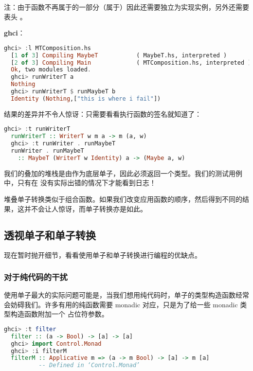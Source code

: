 \documentclass[./main.tex]{subfiles}
\begin{document}
注：由于函数不再属于的一部分（属于）因此还需要独立为实现实例，另外还需要表头
。

\textbf{ghci}：

\begin{lstlisting}[language=Haskell]
  ghci> :l MTComposition.hs
  [1 of 3] Compiling MaybeT           ( MaybeT.hs, interpreted )
  [2 of 3] Compiling Main             ( MTComposition.hs, interpreted )
  Ok, two modules loaded.
  ghci> runWriterT a
  Nothing
  ghci> runWriterT $ runMaybeT b
  Identity (Nothing,["this is where i fail"])
\end{lstlisting}

结果的差异并不令人惊讶：只需要看看执行函数的签名就知道了：

\begin{lstlisting}[language=Haskell]
  ghci> :t runWriterT
  runWriterT :: WriterT w m a -> m (a, w)
  ghci> :t runWriter . runMaybeT
  runWriter . runMaybeT
    :: MaybeT (WriterT w Identity) a -> (Maybe a, w)
\end{lstlisting}

我们的叠加的堆栈是由作为底层单子，因此必须返回一个类型。我们的测试用例中，只有在
没有实际出错的情况下才能看到日志！

堆叠单子转换类似于组合函数。如果我们改变应用函数的顺序，然后得到不同的结果，这并不会让人惊讶，而单子转换亦是如此。

\subsection*{透视单子和单子转换}

现在暂时抛开细节，看看使用单子和单子转换进行编程的优缺点。

\subsubsection*{对于纯代码的干扰}

使用单子最大的实际问题可能是，当我们想用纯代码时，单子的类型构造函数经常会妨碍我们。许多有用的纯函数需要 monadic 对应，只是为了给一些 monadic 类型构造函数附加一个
占位符参数。

\begin{lstlisting}[language=Haskell]
  ghci> :t filter
  filter :: (a -> Bool) -> [a] -> [a]
  ghci> import Control.Monad
  ghci> :i filterM
  filterM :: Applicative m => (a -> m Bool) -> [a] -> m [a]
          -- Defined in ‘Control.Monad’
\end{lstlisting}
\end{document}
